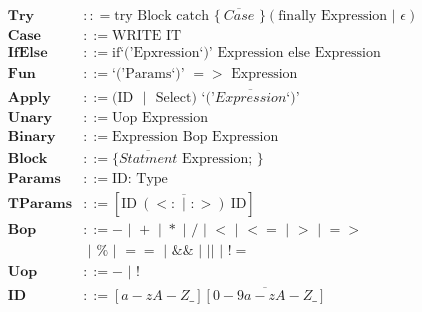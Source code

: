 \documentclass[12pt]{article}
\newcommand\bnf{\,\,|\,\,}
\renewcommand\c[1]{\text{#1}}
\begin{document}
\begin{align*}
  \textbf{Try} & :: = \c{try Block catch \{}~\overline{Case} \c{ \} }
      (\c{finally Expression} \bnf \epsilon) \\
  \textbf{Case} & ::= \c{WRITE IT} \\
  \textbf{IfElse} & ::= \c{if`('Epxression`)' Expression else Expression} \\
  \textbf{Fun} & ::= \c{`('Params`)' $=>$ Expression} \\
  \textbf{Apply} & ::= \c{(ID $\bnf$ Select) `('$\overline{Expression}$`)'} \\
  \textbf{Unary} & ::= \c{Uop Expression} \\
  \textbf{Binary} & ::= \c{Expression Bop Expression} \\
  \textbf{Block} & ::= \c{\{ $\overline{Statment}$ Expression; \}} \\
  \textbf{Params} & ::= \c{ID: Type} \\
  \textbf{TParams} & ::= [\overline{\c{ID}~(<: \bnf :>)~\c{ID}}] \\
  \textbf{Bop} & ::= - \bnf + \bnf * \bnf / \bnf < \bnf <= \bnf > \bnf => \\
      & \bnf \% \bnf == \bnf \&\& \bnf \texttt{||} \bnf != \\
  \textbf{Uop} & ::= - \bnf ! \\
  \textbf{ID} & ::= [a-zA-Z\_]\overline{[0-9a-zA-Z\_]} \\
\end{align*}
\end{document}

